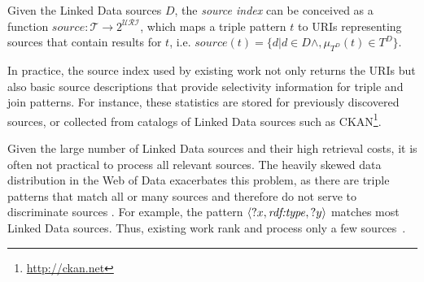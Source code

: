 \begin{definition}
  \label{def:index}
  Given the Linked Data sources $D$, the \emph{source index} can be conceived as a function $source : \mathcal{T} \to 2^\mathcal{URI}$, which maps a triple pattern $t$ to URIs representing sources that contain results for $t$, i.e. $source(t) =
  \{d| d \in D \wedge, \mu_{T^D}(t) \in T^D\}$. 
\end{definition}
%

In practice, the source index used by existing work not only returns the URIs but also basic source descriptions that provide selectivity information for triple and join patterns. For instance, these statistics are stored for previously discovered sources, or collected from catalogs of Linked Data sources such as CKAN\footnote{\url{http://ckan.net}}.

Given the large number of Linked Data sources and their high retrieval costs, it is often not practical to process all relevant sources. The heavily skewed data
distribution in the Web of Data exacerbates this problem, as there are
triple patterns that match all or many sources and therefore do not
serve to discriminate sources \cite{ladwig_linked_2010}. For example, 
the pattern $\langle ?x, \mbox{\emph{rdf:type}}, ?y \rangle$ matches most Linked Data sources. Thus, existing work rank and process only a few sources~\cite{harth_data_2010,ladwig_linked_2010}.


